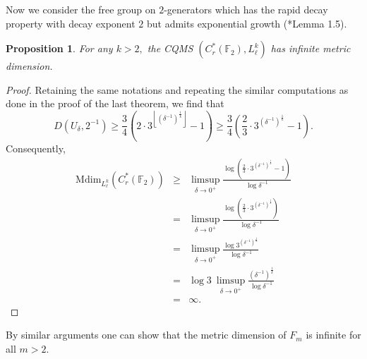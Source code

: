 \documentclass[a4paper,11pt,reqno]{amsart}
\theoremstyle{plain}
\newtheorem{prop}[thm]{Proposition}
\theoremstyle{mainthmstyle}
\theoremstyle{named}
\numberwithin{equation}{section}
\newcommand{\Bea}{\begin{eqnarray*}}
\newcommand{\Eea}{\end{eqnarray*}}
\begin{document}
Now we consider the free group on $2$-generators which has the rapid decay property with decay exponent $2$ but admits exponential growth (\cite{Haagerup}*{Lemma 1.5}). 
\begin{prop}
    For any $k > 2,$ the CQMS $(C^{\ast}_{r}(\mathbb{F}_{2}),L^{k}_{\ell})$ has infinite metric dimension.
\end{prop}
\begin{proof}
Retaining the same notations and repeating the similar computations as done in the proof of the last theorem, we find that $$D \left (U_{\delta}, 2^{-1} \right ) \geq \frac {3} {4} \left (2 \cdot 3^{\left \lfloor \left (\delta^{-1} \right )^{\frac {1} {k}} \right \rfloor} - 1 \right ) \geq \frac {3} {4} \left (\frac {2} {3} \cdot 3^{\left (\delta^{-1} \right )^{\frac {1} {k}}} - 1 \right ).$$ 
Consequently, \Bea\mathrm {Mdim}_{L_{\ell}^{k}} \left (C_{r}^{\ast} (\mathbb{F}_{2}) \right ) & \geq & \limsup\limits_{\delta \to 0^{+}} \frac {\log \left (\frac {2} {3} \cdot 3^{\left (\delta^{-1} \right )^{\frac {1} {k}}} - 1 \right )} {\log \delta^{-1}} \\ & = & \limsup\limits_{\delta \to 0^{+}} \frac {\log \left (\frac {2} {3} \cdot 3^{\left (\delta^{-1} \right )^{\frac {1} {k}}} \right )} {\log \delta^{-1}} \\ & = & \limsup\limits_{\delta \to 0^{+}} \frac {\log 3^{\left (\delta^{-1} \right )^{\frac {1} {k}}}} {\log \delta^{-1}} \\ & = & \log 3\ \limsup\limits_{\delta \to 0^{+}} \frac {\left (\delta^{-1} \right )^{\frac {1} {k}}} {\log \delta^{-1}} \\ & = & \infty. \Eea    
\end{proof}

By similar arguments one can show that the metric dimension of $F_m$ is infinite for all $m > 2.$

\vspace{5mm}
\end{document}
